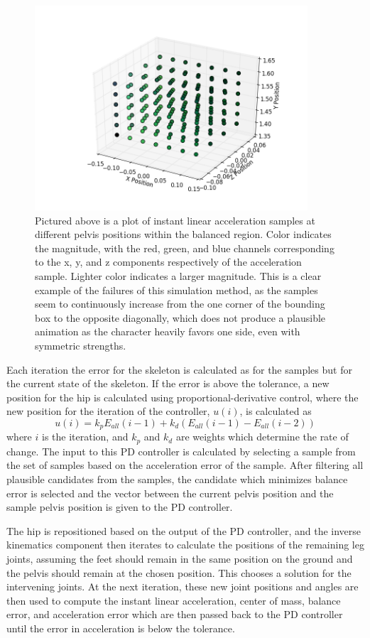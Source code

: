 \begin{figure}[ht]
	\centering
	\includegraphics[width=4in]{images/K200000_global_dense_torque.png}
	\caption[A plot of a sample field for the torque based simulation]{Pictured above is a plot of instant linear acceleration samples at different pelvis positions within the balanced region.  Color indicates the magnitude, with the red, green, and blue channels corresponding to the x, y, and z components respectively of the acceleration sample.  Lighter color indicates a larger magnitude.  This is a clear example of the failures of this simulation method, as the samples seem to continuously increase from the one corner of the bounding box to the opposite diagonally, which does not produce a plausible animation as the character heavily favors one side, even with symmetric strengths.}
	\label{fig:torque_samples}
\end{figure}

Each iteration the error for the skeleton is calculated as for the samples but for the current state of the skeleton.  If the error is above the tolerance, a new position for the hip is calculated using proportional-derivative control, where the new position for the iteration of the controller, $u(i)$, is calculated as \[u(i) = k_p E_{all}(i - 1) + k_d(E_{all}(i-1) - E_{all}(i-2))\] where $i$ is the iteration, and $k_p$ and $k_d$ are weights which determine the rate of change.  The input to this PD controller is calculated by selecting a sample from the set of samples based on the acceleration error of the sample.  After filtering all plausible candidates from the samples, the candidate which minimizes balance error is selected and the vector between the current pelvis position and the sample pelvis position is given to the PD controller.  

The hip is repositioned based on the output of the PD controller, and the inverse kinematics component then iterates to calculate the positions of the remaining leg joints, assuming the feet should remain in the same position on the ground and the pelvis should remain at the chosen position.  This chooses a solution for the intervening joints.  At the next iteration, these new joint positions and angles are then used to compute the instant linear acceleration, center of mass, balance error, and acceleration error which are then passed back to the PD controller until the error in acceleration is below the tolerance.


